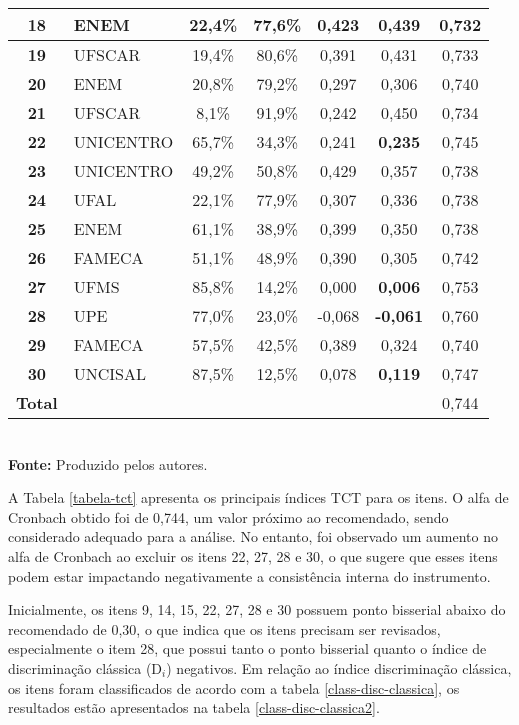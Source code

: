 \begin{table}[H]
\begin{tabular*}{\textwidth}{@{\extracolsep{\fill}}clccccc@{}}
\hline \textbf{18} & ENEM & 22,4\% & 77,6\% & 0,423 & 0,439 & 0,732 \\ 
\hline \textbf{19} & UFSCAR & 19,4\% & 80,6\% & 0,391 & 0,431 & 0,733 \\ 
\hline \textbf{20} & ENEM & 20,8\% & 79,2\% & 0,297 & 0,306 & 0,740 \\ 
\hline \textbf{21} & UFSCAR & 8,1\% & 91,9\% & 0,242 & 0,450 & 0,734 \\ 
\hline \textbf{22} & UNICENTRO & 65,7\% & 34,3\% & 0,241 & \textbf{0,235} & 0,745 \\ 
\hline \textbf{23} & UNICENTRO & 49,2\% & 50,8\% & 0,429 & 0,357 & 0,738 \\ 
\hline \textbf{24} & UFAL & 22,1\% & 77,9\% & 0,307 & 0,336 & 0,738 \\ 
\hline \textbf{25} & ENEM & 61,1\% & 38,9\% & 0,399 & 0,350 & 0,738 \\ 
\hline \textbf{26} & FAMECA & 51,1\% & 48,9\% & 0,390 & 0,305 & 0,742 \\ 
\hline \textbf{27} & UFMS & 85,8\% & 14,2\% & 0,000 & \textbf{0,006} & 0,753 \\ 
\hline \textbf{28} & UPE & 77,0\% & 23,0\% & -0,068 & \textbf{-0,061} & 0,760 \\ 
\hline \textbf{29} & FAMECA & 57,5\% & 42,5\% & 0,389 & 0,324 & 0,740 \\ 
\hline \textbf{30} & UNCISAL & 87,5\% & 12,5\% & 0,078 & \textbf{0,119} & 0,747 \\
		\hline  \textbf{Total} &&&&&& 0,744 \\
			\bottomrule
		\end{tabular*}\\
		\vspace*{0.5cm}
		\small{\textbf{Fonte:} Produzido pelos autores.}
\end{table}


A Tabela \ref{tabela-tct} apresenta os principais índices TCT para os itens. O alfa de Cronbach obtido foi de 0,744, um valor próximo ao recomendado, sendo considerado adequado para a análise. No entanto, foi observado um aumento no alfa de Cronbach ao excluir os itens  22, 27, 28 e 30, o que sugere que esses itens podem estar impactando negativamente a consistência interna do instrumento.

Inicialmente, os itens 9, 14, 15, 22, 27, 28 e 30 possuem ponto bisserial abaixo do recomendado de 0,30, o que indica que os itens precisam ser revisados, especialmente o item 28, que possui tanto o ponto bisserial quanto o índice de discriminação clássica (D$_i$) negativos. Em relação ao índice discriminação clássica, os itens foram classificados de acordo com a tabela \ref{class-disc-classica}, os resultados estão apresentados na tabela \ref{class-disc-classica2}.

